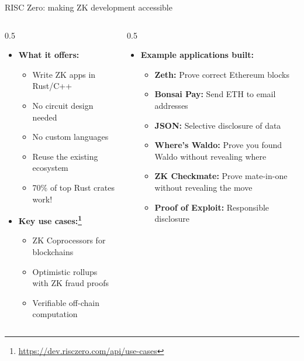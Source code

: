 \ifdefined\PRESENTATION\else\PassOptionsToClass{handout}{beamer}\fi\documentclass[aspectratio=169, lualatex]{beamer}
\begin{document}
\begin{frame}{RISC Zero: making ZK development accessible}
	\begin{columns}[c]
		\begin{column}{0.5\textwidth}
			\begin{itemize}
				\item \textbf{What it offers:}
				      \begin{itemize}
					      \item Write ZK apps in Rust/C++
					      \item No circuit design needed
					      \item No custom languages
					      \item Reuse the existing ecosystem
					      \item 70\% of top Rust crates work!
				      \end{itemize}
				\item \textbf{Key use cases:\footnote{\url{https://dev.risczero.com/api/use-cases}}}
				      \begin{itemize}
					      \item ZK Coprocessors for blockchains
					      \item Optimistic rollups with ZK fraud proofs
					      \item Verifiable off-chain computation
				      \end{itemize}
			\end{itemize}
		\end{column}
		\begin{column}{0.5\textwidth}
			\begin{itemize}
				\item \textbf{Example applications built:}
				      \begin{itemize}
					      \item \textbf{Zeth:} Prove correct Ethereum blocks
					      \item \textbf{Bonsai Pay:} Send ETH to email addresses
					      \item \textbf{JSON:} Selective disclosure of data
					      \item \textbf{Where's Waldo:} Prove you found Waldo without revealing where
					      \item \textbf{ZK Checkmate:} Prove mate-in-one without revealing the move
					      \item \textbf{Proof of Exploit:} Responsible disclosure
				      \end{itemize}
			\end{itemize}
		\end{column}
	\end{columns}
\end{frame}
\end{document}
